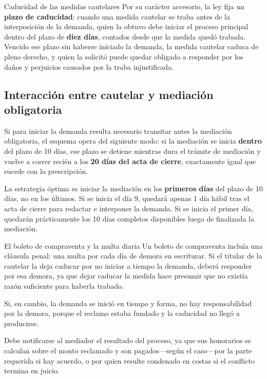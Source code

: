 \documentclass[12pt,oneside]{book}
\begin{document}
\begin{normref}{Caducidad de las medidas cautelares}
Por su carácter accesorio, la ley fija un \textbf{plazo de caducidad}:
cuando una medida cautelar se traba antes de la interposición de la
demanda, quien la obtuvo debe iniciar el proceso principal dentro del
plazo de \textbf{diez días}, contados desde que la medida quedó
trabada. Vencido ese plazo sin haberse iniciado la demanda, la medida
cautelar caduca de pleno derecho, y quien la solicitó puede quedar
obligado a responder por los daños y perjuicios causados por la traba
injustificada.
\end{normref}

\subsection{Interacci\'on entre cautelar y mediaci\'on obligatoria}

Si para iniciar la demanda resulta necesario transitar antes la
mediación obligatoria, el esquema opera del siguiente modo: si la
mediación se inicia \textbf{dentro} del plazo de 10 días, ese plazo
se detiene mientras dura el trámite de mediación y vuelve a correr
recién a los \textbf{20 días del acta de cierre}, exactamente igual
que sucede con la prescripción.

\begin{important}
La estrategia óptima es iniciar la mediación en los \textbf{primeros
días} del plazo de 10 días, no en los últimos. Si se inicia el día 9,
quedará apenas 1 día hábil tras el acta de cierre para redactar e
interponer la demanda. Si se inicia el primer día, quedarán
prácticamente los 10 días completos disponibles luego de finalizada la
mediación.
\end{important}

\begin{example}{El boleto de compraventa y la multa diaria}
Un boleto de compraventa incluía una cláusula penal: una multa por
cada día de demora en escriturar. Si el titular de la cautelar la
deja caducar por no iniciar a tiempo la demanda, deberá responder
por esa demora, ya que dejar caducar la medida hace presumir que no
existía razón suficiente para haberla trabado.

Si, en cambio, la demanda se inició en tiempo y forma, no hay
responsabilidad por la demora, porque el reclamo estaba fundado y
la caducidad no llegó a producirse.
\end{example}

\begin{note}
Debe notificarse al mediador el resultado del proceso, ya que sus
honorarios se calculan sobre el monto reclamado y son pagados---según
el caso---por la parte requerida si hay acuerdo, o por quien resulte
condenado en costas si el conflicto termina en juicio.
\end{note}
\end{document}
